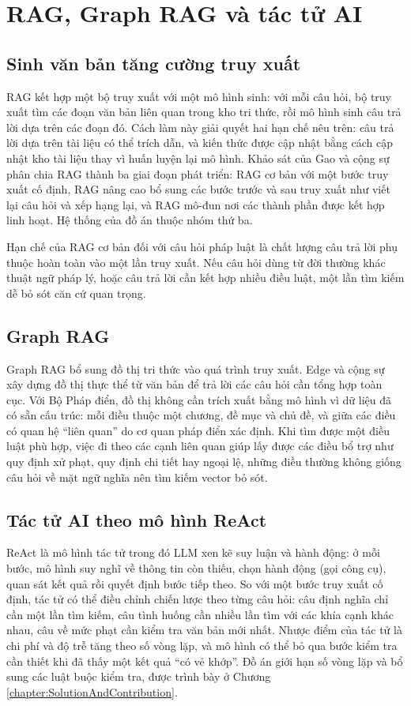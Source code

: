 \documentclass[../DoAn.tex]{subfiles}
\begin{document}
\section{RAG, Graph RAG và tác tử AI}
\label{section:3.2}

\subsection{Sinh văn bản tăng cường truy xuất}
RAG \cite{lewis2020rag} kết hợp một bộ truy xuất với một mô hình sinh: với mỗi câu hỏi, bộ truy xuất tìm các đoạn văn bản liên quan trong kho tri thức, rồi mô hình sinh câu trả lời dựa trên các đoạn đó. Cách làm này giải quyết hai hạn chế nêu trên: câu trả lời dựa trên tài liệu có thể trích dẫn, và kiến thức được cập nhật bằng cách cập nhật kho tài liệu thay vì huấn luyện lại mô hình. Khảo sát của Gao và cộng sự \cite{gao2023ragsurvey} phân chia RAG thành ba giai đoạn phát triển: RAG cơ bản với một bước truy xuất cố định, RAG nâng cao bổ sung các bước trước và sau truy xuất như viết lại câu hỏi và xếp hạng lại, và RAG mô-đun nơi các thành phần được kết hợp linh hoạt. Hệ thống của đồ án thuộc nhóm thứ ba.

Hạn chế của RAG cơ bản đối với câu hỏi pháp luật là chất lượng câu trả lời phụ thuộc hoàn toàn vào một lần truy xuất. Nếu câu hỏi dùng từ đời thường khác thuật ngữ pháp lý, hoặc câu trả lời cần kết hợp nhiều điều luật, một lần tìm kiếm dễ bỏ sót căn cứ quan trọng.

\subsection{Graph RAG}
Graph RAG bổ sung đồ thị tri thức vào quá trình truy xuất. Edge và cộng sự \cite{edge2024graphrag} xây dựng đồ thị thực thể từ văn bản để trả lời các câu hỏi cần tổng hợp toàn cục. Với Bộ Pháp điển, đồ thị không cần trích xuất bằng mô hình vì dữ liệu đã có sẵn cấu trúc: mỗi điều thuộc một chương, đề mục và chủ đề, và giữa các điều có quan hệ ``liên quan'' do cơ quan pháp điển xác định. Khi tìm được một điều luật phù hợp, việc đi theo các cạnh liên quan giúp lấy được các điều bổ trợ như quy định xử phạt, quy định chi tiết hay ngoại lệ, những điều thường không giống câu hỏi về mặt ngữ nghĩa nên tìm kiếm vector bỏ sót.

\subsection{Tác tử AI theo mô hình ReAct}
ReAct \cite{yao2023react} là mô hình tác tử trong đó LLM xen kẽ suy luận và hành động: ở mỗi bước, mô hình suy nghĩ về thông tin còn thiếu, chọn hành động (gọi công cụ), quan sát kết quả rồi quyết định bước tiếp theo. So với một bước truy xuất cố định, tác tử có thể điều chỉnh chiến lược theo từng câu hỏi: câu định nghĩa chỉ cần một lần tìm kiếm, câu tình huống cần nhiều lần tìm với các khía cạnh khác nhau, câu về mức phạt cần kiểm tra văn bản mới nhất. Nhược điểm của tác tử là chi phí và độ trễ tăng theo số vòng lặp, và mô hình có thể bỏ qua bước kiểm tra cần thiết khi đã thấy một kết quả ``có vẻ khớp''. Đồ án giới hạn số vòng lặp và bổ sung các luật buộc kiểm tra, được trình bày ở Chương \ref{chapter:SolutionAndContribution}.
\end{document}
